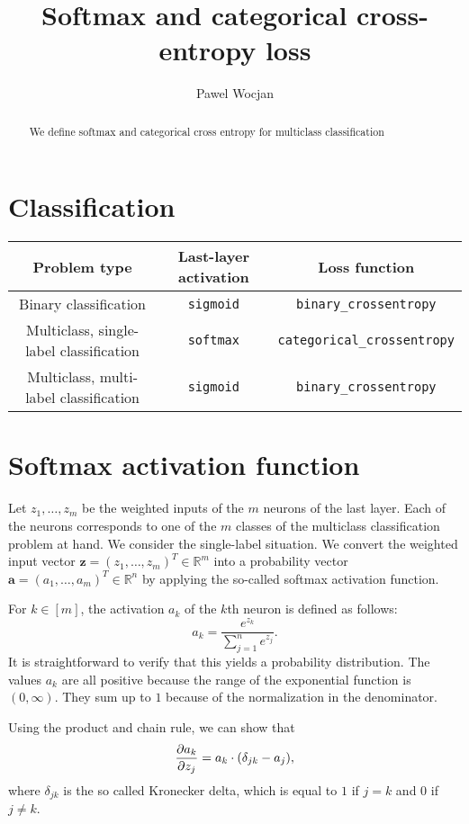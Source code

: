 \documentclass[12pt]{article}
\title{Softmax and categorical cross-entropy loss}
\author{Pawel Wocjan}
\newcommand{\R}{\mathbb{R}}
\begin{document}
\maketitle


\begin{abstract}
We define softmax and categorical cross entropy for multiclass classification 
\end{abstract}

\section{Classification}

\begin{tabular}{|c|c|c|}
\hline
Problem type & Last-layer activation & Loss function \\ \hline \hline
Binary classification & \texttt{sigmoid} & \texttt{binary\_crossentropy} \\ \hline
Multiclass, single-label classification & \texttt{softmax} & \texttt{categorical\_crossentropy} \\ \hline
Multiclass, multi-label classification & \texttt{sigmoid} & \texttt{binary\_crossentropy} \\ \hline
\end{tabular}

\section{Softmax activation function}

Let $z_1,\ldots,z_m$ be the weighted inputs of the $m$ neurons of the last layer. Each of the neurons corresponds to one of the $m$ classes of the multiclass classification problem at hand. We consider the single-label situation. We convert the weighted input vector $\boldsymbol{z}=(z_1,\ldots,z_m)^T\in\R^m$ into a probability vector $\boldsymbol{a}=(a_1,\ldots,a_m)^T\in\R^n$ by applying the so-called softmax activation function. 

For $k\in [m]$, the activation $a_k$ of the $k$th neuron is defined as follows:
\begin{equation}
a_k = \frac{e^{z_k}}{\sum_{j=1}^n e^{z_j}}.
\end{equation}
It is straightforward to verify that this yields a probability distribution. The values $a_k$ are all positive because the range of the exponential function is $(0,\infty)$. They sum up to $1$ because of the normalization in the denominator.

Using the product and chain rule, we can show that
\begin{equation}\label{eq:aoverz}
{\partial a_k \over \partial z_j} = a_k \cdot (\delta_{jk} - a_j),
\end{equation}
where $\delta_{jk}$ is the so called Kronecker delta, which is equal to $1$ if $j=k$ and $0$ if $j\neq k$.
\end{document}
